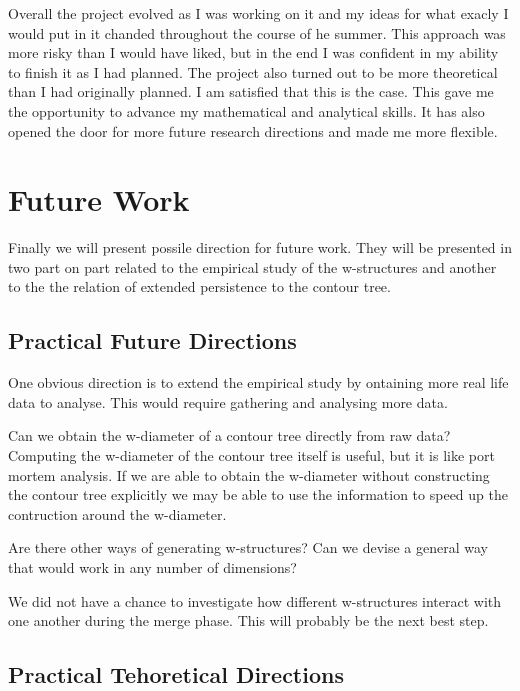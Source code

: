 Overall the project evolved as I was working on it and my ideas for what exacly I would put in it chanded throughout the course of he summer. This approach was more risky than I would have liked, but in the end I was confident in my ability to finish it as I had planned. The project also turned out to be more theoretical than I had originally planned. I am satisfied that this is the case. This gave me the opportunity to advance my mathematical and analytical skills. It has also opened the door for more future research directions and made me more flexible.



\section{Future Work}

Finally we will present possile direction for future work. They will be presented in two part on part related to the empirical study of the w-structures and another to the the relation of extended persistence to the contour tree.



\subsection{Practical Future Directions}

One obvious direction is to extend the empirical study by ontaining more real life data to analyse. This would require gathering and analysing more data.

Can we obtain the w-diameter of a contour tree directly from raw data? Computing the w-diameter of the contour tree itself is useful, but it is like port mortem analysis. If we are able to obtain the w-diameter without constructing the contour tree explicitly we may be able to use the information to speed up the contruction around the w-diameter.

Are there other ways of generating w-structures? Can we devise a general way that would work in any number of dimensions?

We did not have a chance to investigate how different w-structures interact with one another during the merge phase. This will probably be the next best step.

\subsection{Practical Tehoretical Directions}

